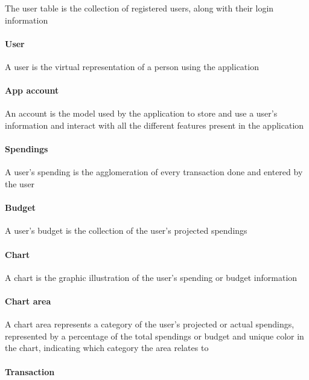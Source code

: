 \documentclass[letterpaper]{article}
\begin{document}
		The user table is the collection of registered users, along with their login information
	
	\paragraph{User}
	
		A user is the virtual representation of a person using the application
	
	\paragraph{App account}
	
		An account is the model used by the application to store and use a user's information and interact with all the different features present in the application
	
	\paragraph{Spendings}
	
		A user's spending is the agglomeration of every transaction done and entered by the user
	
	\paragraph{Budget}
	
		A user's budget is the collection of the user's projected spendings
	
	\paragraph{Chart}
	
		A chart is the graphic illustration of the user's spending or budget information
	
	\paragraph{Chart area}
	
		A chart area represents a category of the user's projected or actual spendings, represented by a percentage of the total spendings or budget and unique color in the chart, indicating which category the area relates to
		
	\paragraph{Transaction}
	
\end{document}
